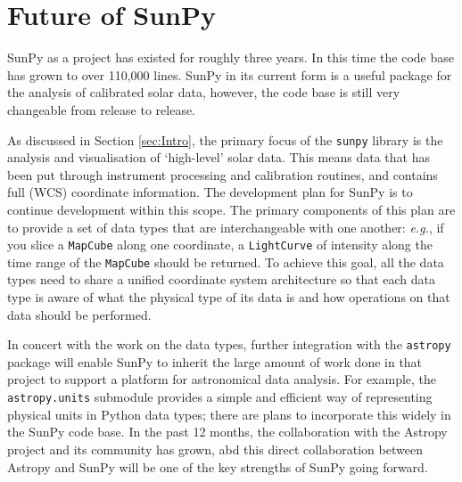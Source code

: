 \section{Future of SunPy}\label{sec:future}
SunPy as a project has existed for roughly three years. In this time 
the code 
base has grown to over 110,000 lines. SunPy in its current form is a 
useful 
package for the analysis of calibrated solar data, however, the code 
base is 
still very changeable from release to release.

As discussed in Section \ref{sec:Intro}, the primary focus of the 
\texttt{sunpy} library is the analysis and visualisation of `high-level' solar 
data. This means data that has been put through instrument processing 
and 
calibration routines, and contains full (WCS) coordinate information. 
The 
development plan for SunPy is to continue development within this 
scope. The 
primary components of this plan are to provide a set of data types 
that are 
interchangeable with one another: \textit{e.g.}, if you slice a 
\texttt{MapCube} 
along one coordinate, a \texttt{LightCurve} of intensity along the 
time range of 
the \texttt{MapCube} should be returned. To achieve this goal, all the 
data 
types need to share a unified coordinate system architecture so that 
each data 
type is aware of what the physical type of its data is and how 
operations on 
that data should be performed.

In concert with the work on the data types, further integration with 
the 
\texttt{astropy} package will enable SunPy to inherit the large 
amount of work 
done in that project to support a platform for astronomical data 
analysis. For 
example, the \texttt{astropy.units} submodule provides a simple and 
efficient 
way of representing physical units in Python data types; there are 
plans to 
incorporate this widely in the SunPy code base. In the past 12 months, 
the 
collaboration with the Astropy project 
\citep{theastropycollaboration2013} and 
its community has grown, abd this direct collaboration between Astropy 
and 
SunPy will be one of the key strengths of SunPy going forward.

